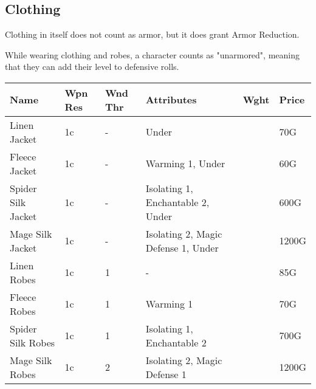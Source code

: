 \subsection{Clothing}

Clothing in itself does not count as armor, but it does grant Armor Reduction.

While wearing clothing and robes, a character counts as "unarmored", meaning that they can add their level to defensive rolls.

\begin{longtable}{p{3cm} | p{1.5cm} | p{1cm} | p{4cm} | p{1cm} | p{1.5cm}}
	Name & Wpn Res & Wnd Thr &  Attributes & Wght & Price\\ \hline
	Linen Jacket & 1c & - & Under &  & 70G\\
	
	Fleece Jacket & 1c & - & Warming 1, Under &  & 60G\\
	
	Spider Silk Jacket & 1c & - & Isolating 1, Enchantable 2, Under &  & 600G\\
	
	Mage Silk Jacket & 1c & - & Isolating 2, Magic Defense 1, Under & & 1200G\\
	
	Linen Robes & 1c & 1 & - &  & 85G\\
	
	Fleece Robes & 1c & 1 & Warming 1 &  & 70G\\

	Spider Silk Robes & 1c & 1 & Isolating 1, Enchantable 2 &  & 700G\\
	
	Mage Silk Robes & 1c & 2 & Isolating 2, Magic Defense 1 &  & 1200G\\
\end{longtable}